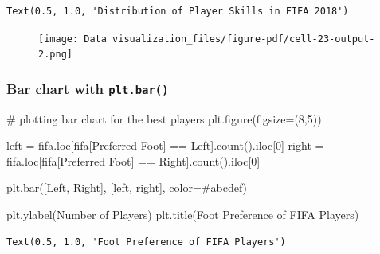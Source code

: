 \documentclass[
  letterpaper,
  DIV=11,
  numbers=noendperiod]{scrreprt}
\newenvironment{Shaded}{\begin{snugshade}}{\end{snugshade}}
\newcommand{\CommentTok}[1]{\textcolor[rgb]{0.37,0.37,0.37}{#1}}
\newcommand{\DecValTok}[1]{\textcolor[rgb]{0.68,0.00,0.00}{#1}}
\newcommand{\NormalTok}[1]{\textcolor[rgb]{0.00,0.23,0.31}{#1}}
\newcommand{\OperatorTok}[1]{\textcolor[rgb]{0.37,0.37,0.37}{#1}}
\newcommand{\StringTok}[1]{\textcolor[rgb]{0.13,0.47,0.30}{#1}}
\begin{document}
\begin{verbatim}
Text(0.5, 1.0, 'Distribution of Player Skills in FIFA 2018')
\end{verbatim}

\begin{figure}[H]

{\centering \texttt{[image: Data visualization\_files/figure-pdf/cell-23-output-2.png]}

}

\end{figure}

\hypertarget{bar-chart-with-plt.bar}{%
\subsubsection{\texorpdfstring{Bar chart with
\texttt{plt.bar()}}{Bar chart with plt.bar()}}\label{bar-chart-with-plt.bar}}

\begin{Shaded}
\begin{Highlighting}[]
\CommentTok{\# plotting bar chart for the best players}
\NormalTok{plt.figure(figsize}\OperatorTok{=}\NormalTok{(}\DecValTok{8}\NormalTok{,}\DecValTok{5}\NormalTok{))}

\NormalTok{left }\OperatorTok{=}\NormalTok{ fifa.loc[fifa[}\StringTok{\textquotesingle{}Preferred Foot\textquotesingle{}}\NormalTok{] }\OperatorTok{==} \StringTok{\textquotesingle{}Left\textquotesingle{}}\NormalTok{].count().iloc[}\DecValTok{0}\NormalTok{]}
\NormalTok{right }\OperatorTok{=}\NormalTok{ fifa.loc[fifa[}\StringTok{\textquotesingle{}Preferred Foot\textquotesingle{}}\NormalTok{] }\OperatorTok{==} \StringTok{\textquotesingle{}Right\textquotesingle{}}\NormalTok{].count().iloc[}\DecValTok{0}\NormalTok{]}

\NormalTok{plt.bar([}\StringTok{\textquotesingle{}Left\textquotesingle{}}\NormalTok{, }\StringTok{\textquotesingle{}Right\textquotesingle{}}\NormalTok{], [left, right], color}\OperatorTok{=}\StringTok{\textquotesingle{}\#abcdef\textquotesingle{}}\NormalTok{)}

\NormalTok{plt.ylabel(}\StringTok{\textquotesingle{}Number of Players\textquotesingle{}}\NormalTok{)}
\NormalTok{plt.title(}\StringTok{\textquotesingle{}Foot Preference of FIFA Players\textquotesingle{}}\NormalTok{)}
\end{Highlighting}
\end{Shaded}

\begin{verbatim}
Text(0.5, 1.0, 'Foot Preference of FIFA Players')
\end{verbatim}
\end{document}
